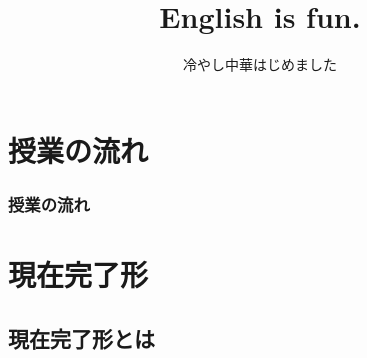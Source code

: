 \documentclass[aspectratio=169,xcolor={dvipsnames,table}]{beamer}
\title{English is fun.}
\subtitle{冷やし中華はじめました}
\author{}
\institute[]{}
\date[]
\begin{document}
\begin{frame}[plain]
  \titlepage
\end{frame}
\section*{授業の流れ}
\begin{frame}[plain]
  \frametitle{授業の流れ}
  \tableofcontents
\end{frame}
\section{現在完了形}
\subsection{現在完了形とは}
\end{document}
